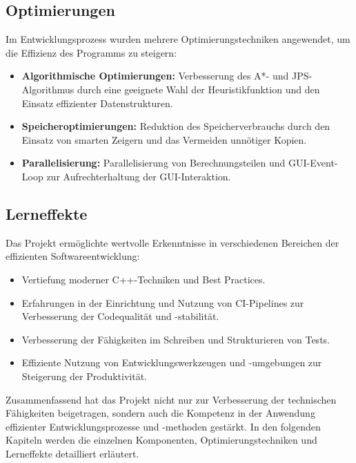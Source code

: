 \subsection*{Optimierungen}
Im Entwicklungsprozess wurden mehrere Optimierungstechniken angewendet, um die Effizienz des Programms zu steigern:
\begin{itemize}
\item \textbf{Algorithmische Optimierungen:} Verbesserung des A*- und \ac{JPS}-Algorith\-mus durch eine geeignete Wahl der Heuristikfunktion und den Einsatz effizienter Datenstrukturen.
\item \textbf{Speicheroptimierungen:} Reduktion des Speicherverbrauchs durch den Einsatz von smarten Zeigern und das Vermeiden unnötiger Kopien.
\item \textbf{Parallelisierung:} Parallelisierung von Berechnungsteilen und \ac{GUI}-Event-Loop zur Aufrechterhaltung der \ac{GUI}-Interaktion.
\end{itemize}

\subsection*{Lerneffekte}
Das Projekt ermöglichte wertvolle Erkenntnisse in verschiedenen Bereichen der effizienten Softwareentwicklung:
\begin{itemize}
\item Vertiefung moderner C++-Techniken und Best Practices.
\item Erfahrungen in der Einrichtung und Nutzung von CI-Pipelines zur Verbesserung der Codequalität und -stabilität.
\item Verbesserung der Fähigkeiten im Schreiben und Strukturieren von Tests.
\item Effiziente Nutzung von Entwicklungswerkzeugen und -umgebungen zur Steigerung der Produktivität.
\end{itemize}
Zusammenfassend hat das Projekt nicht nur zur Verbesserung der technischen Fähigkeiten beigetragen, sondern auch die Kompetenz in der Anwendung effizienter Entwicklungsprozesse und -methoden gestärkt.
In den folgenden Kapiteln werden die einzelnen Komponenten, Optimierungstechniken und Lerneffekte detailliert erläutert.



